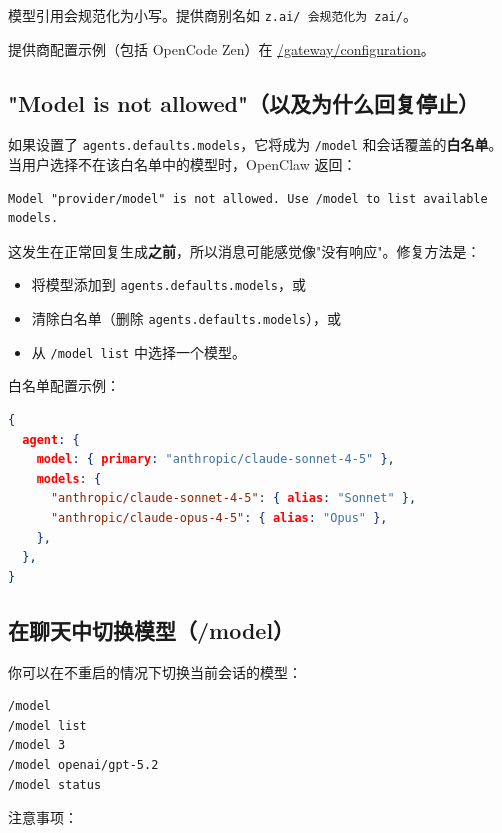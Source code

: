 模型引用会规范化为小写。提供商别名如 \texttt{z.ai/\textit{} 会规范化为 \texttt{zai/}}。

提供商配置示例（包括 OpenCode Zen）在 \href{/gateway/configuration\#opencode-zen-multi-model-proxy}{/gateway/configuration}。

\subsection{"Model is not allowed"（以及为什么回复停止）}


如果设置了 \texttt{agents.defaults.models}，它将成为 \texttt{/model} 和会话覆盖的\textbf{白名单}。当用户选择不在该白名单中的模型时，OpenClaw 返回：

\begin{lstlisting}
Model "provider/model" is not allowed. Use /model to list available models.
\end{lstlisting}


这发生在正常回复生成\textbf{之前}，所以消息可能感觉像"没有响应"。修复方法是：

\begin{itemize}
  \item 将模型添加到 \texttt{agents.defaults.models}，或
  \item 清除白名单（删除 \texttt{agents.defaults.models}），或
  \item 从 \texttt{/model list} 中选择一个模型。
\end{itemize}


白名单配置示例：

\begin{lstlisting}[language=json]
{
  agent: {
    model: { primary: "anthropic/claude-sonnet-4-5" },
    models: {
      "anthropic/claude-sonnet-4-5": { alias: "Sonnet" },
      "anthropic/claude-opus-4-5": { alias: "Opus" },
    },
  },
}
\end{lstlisting}


\subsection{在聊天中切换模型（/model）}


你可以在不重启的情况下切换当前会话的模型：

\begin{lstlisting}
/model
/model list
/model 3
/model openai/gpt-5.2
/model status
\end{lstlisting}


注意事项：

